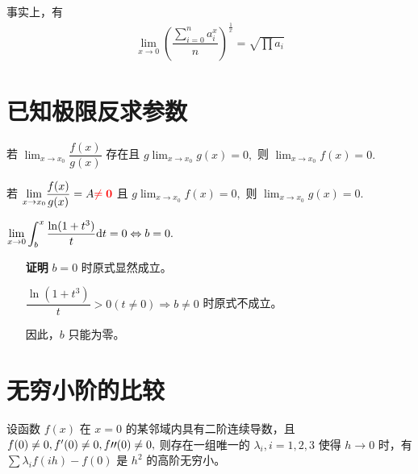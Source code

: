 事实上，有
\begin{equation*}
    \begin{aligned}
        {\displaystyle\lim_{x\rightarrow 0}}
        \left(\dfrac{\sum_{i=0}^n a_i^x}{n}\right)^\frac{1}{x}
        = \sqrt{\prod a_i}
    \end{aligned}
\end{equation*}

\section{已知极限反求参数}

若 $ {\displaystyle\lim_{x\rightarrow x_0}}\dfrac{f(x)}{g(x)} $ 存在且
$ g{\displaystyle\lim_{x\rightarrow x_0}}g(x) = 0, $ 则 $ {\displaystyle\lim_{x\rightarrow x_0}}f(x) = 0. $ 

若 $ {\displaystyle\lim_{x\rightarrow x_0}}\dfrac{f(x)}{g(x)} = A \textcolor{red}{\bf{\neq 0}} $ 且
$ g{\displaystyle\lim_{x\rightarrow x_0}}f(x) = 0, $ 则 $ {\displaystyle\lim_{x\rightarrow x_0}}g(x) = 0. $ 


$ {\displaystyle\lim_{x\rightarrow 0}}
\displaystyle \int_b^x \dfrac{\ln(1+t^3)}{t}\mathrm{d}t = 0 \Leftrightarrow b = 0. $

\begin{itemize}
    \item[\textbf{证明}]
    $ b = 0 $ 时原式显然成立。

    $ \dfrac{\ln(1+t^3)}{t} > 0 (t\neq 0)\Rightarrow b \neq 0 $ 时原式不成立。
    
    因此，$ b $ 只能为零。
\end{itemize}

\section{无穷小阶的比较}


设函数 $ f(x) $ 在 $ x = 0 $ 的某邻域内具有二阶连续导数，且 $ f(0)\neq 0,f'(0)\neq 0,f{\prime\prime}(0)
\neq 0, $ 则存在一组唯一的 $ \lambda_i,i=1,2,3 $ 使得 $ h\rightarrow 0 $ 时，有
$ \sum \lambda_if(ih) - f(0) $ 是 $ h^2 $ 的高阶无穷小。

